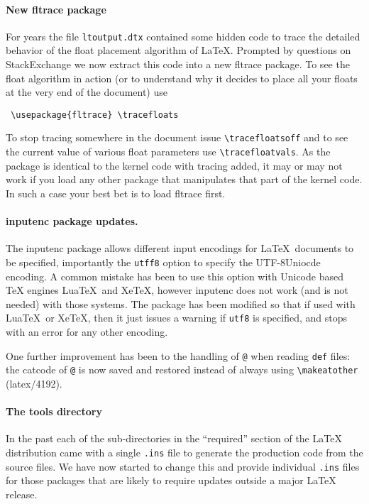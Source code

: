 \documentclass{ltnews}
\begin{document}
\paragraph{New \textsf{fltrace} package}

For years the file \texttt{ltoutput.dtx} contained some hidden code to
trace the detailed behavior of the float placement algorithm of
\LaTeX. Prompted by questions on StackExchange we now extract this
code into a new \textsf{fltrace} package. To see the float algorithm
in action (or to understand why it decides to place all your floats at
the very end of the document) use
\begin{verbatim}
 \usepackage{fltrace} \tracefloats
\end{verbatim}
To stop tracing somewhere in the document issue
\verb=\tracefloatsoff= and to see the current value of various float
parameters use \verb=\tracefloatvals=. As the package is identical to
the kernel code with tracing added, it may or may not work if you load any
other package that manipulates that part of the kernel code. In such a
case your best bet is to load \textsf{fltrace} first.

\paragraph{\textsf{inputenc} package updates.}

The \textsf{inputenc} package allows different input encodings for
\LaTeX\ documents to be specified, importantly the \texttt{utff8}
option to specify the UTF-8Uniocde encoding. A common mistake has been
to use this option with Unicode based TeX engines Lua\TeX\ and Xe\TeX,
however \textsf{inputenc} does not work (and is not needed) with those
systems. The package has been modified so that if used with  Lua\TeX\
or  Xe\TeX, then it just issues a warning if \texttt{utf8} is
specified, and stops with an error for any other encoding.

One further improvement has been to the handling of \texttt{@} when
  reading \texttt{def} files: the  catcode of \texttt{@} is now saved
  and restored instead of always using \verb=\makeatother=  (latex/4192).



\paragraph{The tools directory}

In the past each of the sub-directories in the ``required'' section of
the \LaTeX{} distribution came with a single \texttt{.ins} file to
generate the production code from the source files. We have now
started to change this and provide individual \texttt{.ins} files for
those packages that are likely to require updates outside a major
\LaTeX{} release.
\end{document}
